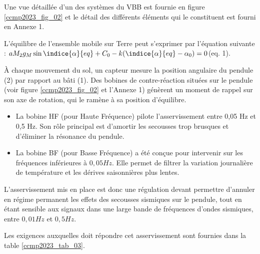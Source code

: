 Une vue détaillée d'un des systèmes du VBB est fournie en figure \ref{ccmp2023_fig_02} et le détail des différents éléments qui le constituent est fourni en Annexe 1.

L’équilibre de l’ensemble mobile sur Terre peut s'exprimer par l'équation suivante : 
$ aM_2 g_M \sin\indice{\alpha}{eq} +C_0 - k( \indice{\alpha}{eq} -\alpha_0)=0 $(eq. 1).
\fi



\ifprof
\else
À chaque mouvement du sol, un capteur mesure la position angulaire du pendule (2) par rapport au bâti (1). Des bobines de contre-réaction situées sur le pendule (voir figure \ref{ccmp2023_fig_02} et l'Annexe 1) génèrent un moment de rappel sur son axe de rotation, qui le ramène à sa position d'équilibre.

\begin{itemize}
  \item La bobine HF (pour Haute Fréquence) pilote l'asservissement entre 0,05 Hz et 0,5 Hz. Son rôle principal est d'amortir les secousses trop brusques et d'éliminer la résonance du pendule.
  \item La bobine BF (pour Basse Fréquence) a été conçue pour intervenir sur les fréquences inférieures à $0,05 \si{Hz}$. Elle permet de filtrer la variation journalière de température et les dérives saisonnières plus lentes.
\end{itemize}

L'asservissement mis en place est donc une régulation devant permettre d'annuler en régime permanent les effets des secousses sismiques sur le pendule, tout en étant sensible aux signaux dans une large bande de fréquences d'ondes sismiques, entre $0,01 \si{Hz}$ et $0,5 \si{Hz}$.

Les exigences auxquelles doit répondre cet asservissement sont fournies dans la table \ref{ccmp2023_tab_03}.

